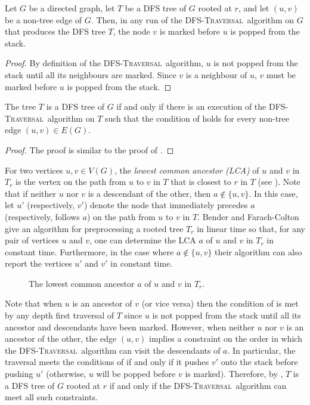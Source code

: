 \documentclass[lotsofwhite]{patmorin}
\newcommand{\dfst}{\textsc{DFS-Traversal}}
\begin{document}
\begin{lem} 
Let $G$ be a directed graph, let $T$ be a DFS tree of $G$ rooted
at $r$, and let $(u,v)$ be a non-tree edge of $G$.  Then, in any run
of the \dfst\ algorithm on $G$ that produces the DFS tree $T$, the
node $v$ is marked before $u$ is popped from the stack.  
\end{lem}

\begin{proof}
By definition of the \dfst\ algorithm, $u$ is not popped from the
stack until all its neighbours are marked.  Since $v$ is a neighbour
of $u$, $v$ must be marked before $u$ is popped from the stack.
\end{proof}

\begin{lem}
The tree $T$ is a DFS tree of $G$ if and only if there is an execution
of the \dfst\ algorithm on $T$ such that the condition of
 holds for every non-tree edge $(u,v)\in E(G)$.  
\end{lem}

\begin{proof}
The proof is similar to the proof of .
\end{proof}

For two vertices $u,v\in V(G)$, the \emph{lowest common ancestor
(LCA)} of $u$ and $v$ in $T_r$ is the vertex on the path from $u$ to
$v$ in $T$ that is closest to $r$ in $T$ (see ).  Note
that if neither $u$ nor $v$ is a descendant of the other, then
$a\notin\{u,v\}$.  In this case, let $u'$ (respectively, $v'$) denote
the node that immediately precedes $a$ (respectively, follows $a$) on
the path from $u$ to $v$ in $T$.  Bender and Farach-Colton \cite{X}
give an algorithm for preprocessing a rooted tree $T_r$ in linear time
so that, for any pair of vertices $u$ and $v$, one can determine the
LCA $a$ of $u$ and $v$ in $T_r$ in constant time.  Furthermore, in the
case where $a\notin\{u,v\}$ their algorithm can also report the
vertices $u'$ and $v'$ in constant time.

\begin{figure}
\caption{The lowest common ancestor $a$ of $u$ and $v$ in
  $T_r$.}
\end{figure}

Note that when $u$ is an ancestor of $v$ (or vice versa) then the
condition of  is met by any depth first traversal of
$T$ since $u$ is not popped from the stack until all its ancestor and
descendants have been marked.  However, when neither $u$ nor $v$ is an
ancestor of the other, the edge $(u,v)$ implies a constraint on the
order in which the \dfst\ algorithm can visit the descendants of $a$.
In particular, the traversal meets the conditions of
 if and only if it pushes $v'$ onto the stack before
pushing $u'$ (otherwise, $u$ will be popped before $v$ is marked).
Therefore, by , $T$ is a DFS tree of $G$ rooted at
$r$ if and only if the \dfst\ algorithm can meet all such constraints.
\end{document}
